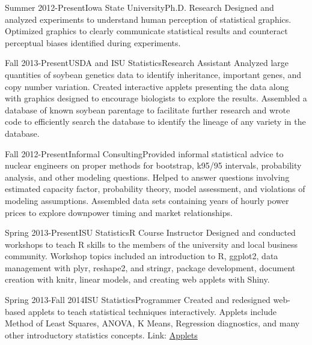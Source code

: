 \documentclass[10pt]{tccv}
\begin{document}
\begin{eventlist}
% 

\item{Summer 2012-Present}{Iowa State University}{Ph.D. Research}{
Designed and analyzed experiments to understand human perception of statistical graphics. Optimized graphics to clearly communicate statistical results and counteract perceptual biases identified during experiments.\cite{sineillusionjcgs,jsm2014,jsm2014userpanel,jsm2013}}

\item{Fall 2013-Present}{USDA and ISU Statistics}{Research Assistant}{
Analyzed large quantities of soybean genetics data to identify inheritance, important genes, and copy number variation. Created interactive applets presenting the data along with graphics designed to encourage biologists to explore the results. Assembled a database of known soybean parentage to facilitate further research and wrote code to efficiently search the database to identify the lineage of any variety in the database. }

\item{Fall 2012-Present}{}{Informal Consulting}{Provided informal statistical advice to nuclear engineers on proper methods for bootstrap, k95/95 intervals, probability analysis, and other modeling questions. Helped to answer questions involving estimated capacity factor, probability theory, model assessment, and violations of modeling assumptions. Assembled data sets containing years of hourly power prices to explore downpower timing and market relationships.}

\item{Spring 2013-Present}{ISU Statistics}{R Course Instructor}{
Designed and conducted workshops to teach R skills to the members of the university and local business community. Workshop topics included an introduction to R, ggplot2, data management with plyr, reshape2, and stringr, package development, document creation with knitr, linear models, and creating web applets with Shiny. }

\item{Spring 2013-Fall 2014}{ISU Statistics}{Programmer}{
Created and redesigned web-based applets to teach statistical techniques interactively. Applets include Method of Least Squares, ANOVA, K Means, Regression diagnostics, and many other introductory statistics concepts. Link: \href{http://vanderplas.dyndns-remote.com:3838/}{Applets}}


\end{eventlist}
\end{document}
